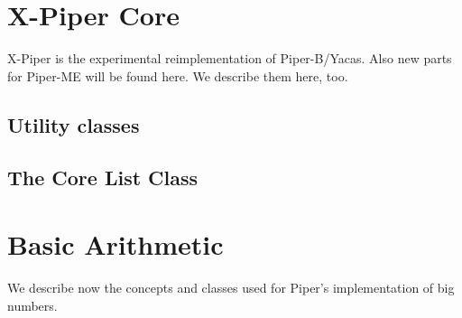 \section{X-Piper Core}

X-Piper is the experimental reimplementation of Piper-B/Yacas. Also
new parts for Piper-ME will be found here. We describe them here, too.


\subsection{Utility classes}




\subsection{The Core List Class}



\section{Basic Arithmetic}

We describe now the concepts and classes used for Piper's implementation
of big numbers.




